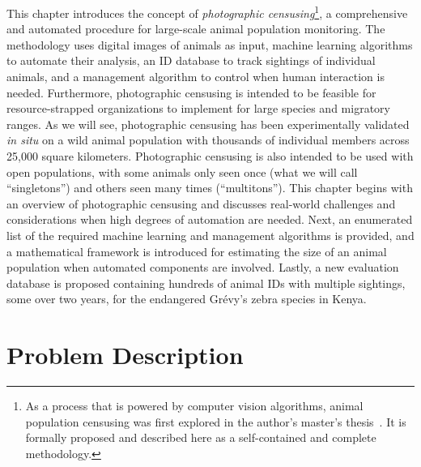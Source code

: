 This chapter introduces the concept of \textit{photographic censusing}\footnote{As a process that is powered by computer vision algorithms, animal population censusing was first explored in the author's master's thesis~\cite{parham_photographic_2015}.  It is formally proposed and described here as a self-contained and complete methodology.}, a comprehensive and automated procedure for large-scale animal population monitoring.  The methodology uses digital images of animals as input, machine learning algorithms to automate their analysis, an ID database to track sightings of individual animals, and a management algorithm to control when human interaction is needed.  Furthermore, photographic censusing is intended to be feasible for resource-strapped organizations to implement for large species and migratory ranges.  As we will see, photographic censusing has been experimentally validated \textit{in situ} on a wild animal population with thousands of individual members across 25,000 square kilometers.  Photographic censusing is also intended to be used with open populations, with some animals only seen once (what we will call ``singletons'') and others seen many times (``multitons'').  This chapter begins with an overview of photographic censusing and discusses real-world challenges and considerations when high degrees of automation are needed.  Next, an enumerated list of the required machine learning and management algorithms is provided, and a mathematical framework is introduced for estimating the size of an animal population when automated components are involved.  Lastly, a new evaluation database is proposed containing hundreds of animal IDs with multiple sightings, some over two years, for the endangered Gr\'evy's zebra species in Kenya.

\section{Problem Description}

